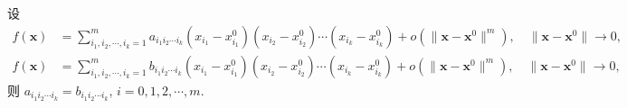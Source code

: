 \begin{theorem}\label{thm:8.3.3}
设
\begin{align*}
  f(\boldsymbol{x}) &= \sum_{i_{1}, i_{2}, \cdots, i_{k}=1}^{m}a_{i_{1}i_{2}\cdots i_{k}}(x_{i_{1}} - x_{i_{1}}^{0})(x_{i_{2}} - x_{i_{2}}^{0})\cdots(x_{i_{k}} - x_{i_{k}}^{0}) + o(\|\boldsymbol{x} - \boldsymbol{x}^{0}\|^{m}), \quad \|\boldsymbol{x} - \boldsymbol{x}^{0}\| \to 0, \\
  f(\boldsymbol{x}) &= \sum_{i_{1}, i_{2}, \cdots, i_{k}=1}^{m}b_{i_{1}i_{2}\cdots i_{k}}(x_{i_{1}} - x_{i_{1}}^{0})(x_{i_{2}} - x_{i_{2}}^{0})\cdots(x_{i_{k}} - x_{i_{k}}^{0}) + o(\|\boldsymbol{x} - \boldsymbol{x}^{0}\|^{m}), \quad \|\boldsymbol{x} - \boldsymbol{x}^{0}\| \to 0,
\end{align*}
则 $a_{i_{1}i_{2}\cdots i_{k}} = b_{i_{1}i_{2}\cdots i_{k}}$, $i = 0, 1, 2, \cdots, m$.
\end{theorem}

